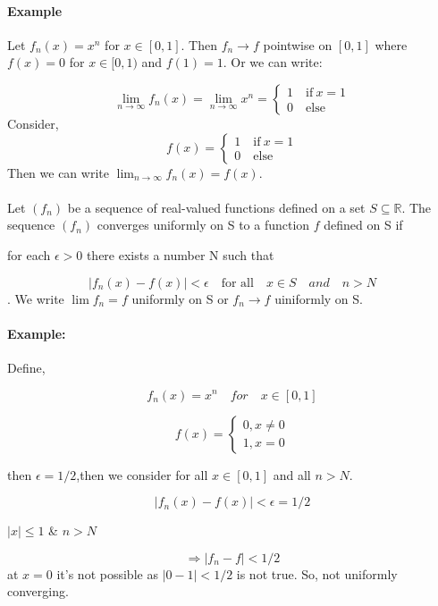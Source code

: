 \documentclass{notes}
\begin{document}
\paragraph{Example}
Let $f_n(x) = x^n$ for $x\in [0, 1]$. Then $f_n\to f$ pointwise on $[0, 1]$ where
$f(x) = 0$ for $x\in [0, 1)$ and $f(1) = 1$. Or we can write:

$$ \lim_{n \to  \infty}   f_n(x) = \lim_{n \to \infty} x^n = \begin{cases}
1\quad \text{if} \ x = 1\\
0 \quad \text{else}
\end{cases}            $$
Consider, 
$$  f(x)  = \begin{cases}
1\quad \text{if} \ x = 1\\
0 \quad \text{else}
\end{cases}            $$
Then we can write $\lim_{n \to \infty} f_n (x) = f(x)$.
\paragraph{}
\begin{definition}{}
	Let $(f_n)$ be a sequence of real-valued functions defined on a set
	$S\subseteq \mathbb{R}$. The sequence $(f_n)$ converges uniformly on S to a function $f$ defined on S if
	
	for each $\epsilon>0$ there exists a number N such that 
	
	$$ |f_n(x) - f(x)| < \epsilon\quad \text{for all}\quad x \in S \quad and \quad n>N$$.
	We write $\lim f_n = f$ uniformly on S or $f_n \to f$ uiniformly on S.
\end{definition}


\paragraph{Example:}Define,

$$f_n(x) = x^n\quad for\quad x\in [0,1]$$

$$ f(x) = \begin{cases}
0, x\not = 0 \\
1, x = 0
\end{cases}$$

then $\epsilon = 1/2$,then we consider for all $x \in [0,1]$ and all $n >N$.

$$ |f_n(x) - f(x)| < \epsilon = 1/2$$

$|x| \leq 1$ \& $n>N$

$$\Rightarrow |f_n - f| < 1/2$$
at $x = 0$ it's not possible as $|0 - 1| < 1/2$ is not true. So, not uniformly converging.
\end{document}

